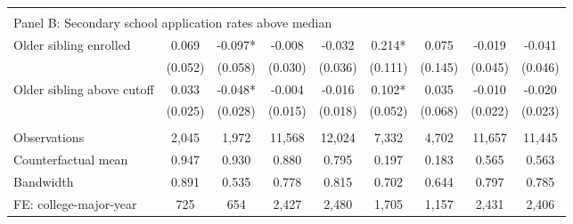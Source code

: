 {{\begin{tabular}{lcccccccc}
&  &  &  & & & & & &    \\
\multicolumn{9}{l}{Panel B: Secondary school application rates above median} \\
Older sibling enrolled&       0.069   &      -0.097*  &      -0.008   &      -0.032   &       0.214*  &       0.075   &      -0.019   &      -0.041   \\
                    &     (0.052)   &     (0.058)   &     (0.030)   &     (0.036)   &     (0.111)   &     (0.145)   &     (0.045)   &     (0.046)   \\
 
Older sibling above cutoff&       0.033   &      -0.048*  &      -0.004   &      -0.016   &       0.102*  &       0.035   &      -0.010   &      -0.020   \\
                    &     (0.025)   &     (0.028)   &     (0.015)   &     (0.018)   &     (0.052)   &     (0.068)   &     (0.022)   &     (0.023)   \\
                    &               &               &               &               &               &               &               &               \\
Observations        &       2,045   &       1,972   &      11,568   &      12,024   &       7,332   &       4,702   &      11,657   &      11,445   \\
Counterfactual mean &       0.947   &       0.930   &       0.880   &       0.795   &       0.197   &       0.183   &       0.565   &       0.563   \\
Bandwidth           &       0.891   &       0.535   &       0.778   &       0.815   &       0.702   &       0.644   &       0.797   &       0.785   \\
FE: college-major-year&         725   &         654   &       2,427   &       2,480   &       1,705   &       1,157   &       2,431   &       2,406   \\
 

\bottomrule
\end{tabular}
}
}

